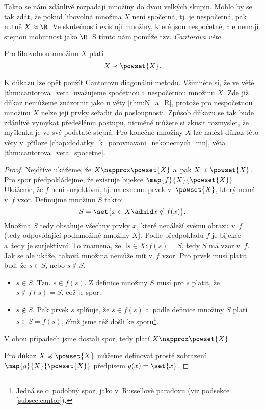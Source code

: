 Takto se nám zdánlivě rozpadají množiny do dvou velkých skupin. Mohlo by se tak zdát, že pokud libovolná množina $X$ není spočetná, tj. je nespočetná, pak nutně $X\approx\R$. Ve skutečnosti existují množiny, které jsou nespočetné, ale nemají stejnou mohutnost jako $\R$. S tímto nám pomůže tzv. \emph{Cantorova věta}.
\begin{theorem}[Cantorova]\label{thm:cantorova_veta}
    Pro libovolnou množinu $X$ platí
    \begin{equation*}
        X\prec\powset{X}.
    \end{equation*}
\end{theorem}
K důkazu lze opět použít Cantorovu diagonální metodu. Všimněte si, že ve větě \ref{thm:cantorova_veta} uvažujeme spočetnou i~nespočetnou množinu $X$. Zde již důkaz nemůžeme znázornit jako u věty \ref{thm:N_a_R}, protože pro nespočetnou množinu $X$ nelze její prvky seřadit do posloupnosti. Způsob důkazu se tak bude zdánlivě vymykat předešlému postupu, nicméně můžete si zkusit rozmyslet, že myšlenka je ve své podstatě stejná. Pro konečné množiny $X$ lze nalézt důkaz této věty v~příloze \ref{chap:dodatky_k_porovnavani_nekonecnych_mn}, věta \ref{thm:cantorova_veta_spocetne}.
\begin{proof}
    Nejdříve ukážeme, že $X\napprox\powset{X}$ a~pak $X\preccurlyeq\powset{X}$. Pro spor předpokládejme, že existuje bijekce $\map{f}{X}{\powset{X}}$. Ukážeme, že $f$ není surjektivní, tj. nalezneme prvek v~$\powset{X}$, který nemá v~$f$ vzor. Definujme množinu $S$ takto:
    \begin{equation*}
        S=\set{x\in X \admid x\notin f(x)}.
    \end{equation*}
    Množina $S$ tedy obsahuje všechny prvky $x$, které nenáleží svému obrazu v~$f$ (tedy odpovídající podmnožině množiny $X$). Podle předpokladu $f$ je bijekce a~tedy je surjektivní. To znamená, že $\exists s\in X: f(s)=S$, tedy $S$ má vzor v~$f$. Jak se ale ukáže, taková množina nemůže mít v~$f$ vzor. Pro prvek musí platit buď, že $s\in S$, nebo $s\notin S$.
    \begin{itemize}
        \item $s\in S$. Tzn. $s\in f(s)$. Z definice množiny $S$ musí pro $s$ platit, že $s\notin f(s)=S$, což je spor.
        \item $s\notin S$. Pak prvek $s$ splňuje, že $s\in f(s)$ a~podle definice množiny $S$ platí $s\in S=f(s)$, čímž jsme též došli ke sporu\footnote{Jedná se o~podobný spor, jako v~Russellově paradoxu (viz podsekce \ref{subsec:cantor}).}.
    \end{itemize}
    V obou případech jsme dostali spor, tedy platí $X\napprox\powset{X}$.\par
    Pro důkaz $X\preccurlyeq\powset{X}$ můžeme definovat prosté zobrazení $\map{g}{X}{\powset{X}}$ předpisem $g(x)=\set{x}$.
\end{proof}

